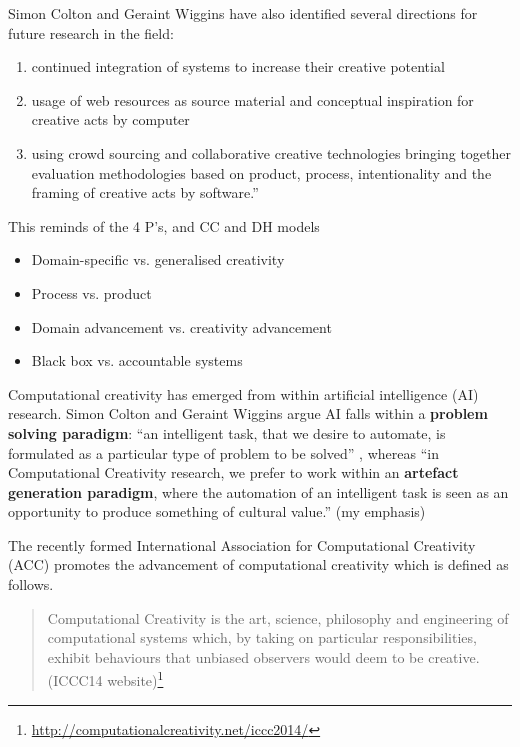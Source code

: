 Simon Colton and Geraint Wiggins have also identified several directions for future research in the field: \citep[p.5]{Colton2012}

\begin{enumerate}
  \item continued integration of systems to increase their creative potential
  \item usage of web resources as source material and conceptual inspiration for creative acts by computer
  \item using crowd sourcing and collaborative creative technologies bringing together evaluation methodologies based on product, process, intentionality and the framing of creative acts by software.'' \citep[p.5]{Colton2012}
\end{enumerate}

\begin{draft}
  This reminds of the 4 P’s, and CC and DH models
\end{draft}

\begin{shaded}
  \begin{itemize}
  \item Domain-specific vs. generalised creativity
  \item Process vs. product
  \item Domain advancement vs. creativity advancement
  \item Black box vs. accountable systems
  \end{itemize}
\end{shaded}

Computational creativity has emerged from within artificial intelligence (AI) research. Simon Colton and Geraint Wiggins argue AI falls within a \textbf{problem solving paradigm}: ``an intelligent task, that we desire to automate, is formulated as a particular type of problem to be solved'' \citep[p.2]{Colton2012},  whereas ``in Computational Creativity research, we prefer to work within an \textbf{artefact generation paradigm}, where the automation of an intelligent task is seen as an opportunity to produce something of cultural value.'' \citep[p.2]{Colton2012}(my emphasis)

The recently formed International Association for Computational Creativity (ACC)  promotes the advancement of computational creativity which is defined as follows.

\begin{quote}
  Computational Creativity is the art, science, philosophy and engineering of computational systems which, by taking on particular responsibilities, exhibit behaviours that unbiased observers would deem to be creative. (ICCC14 website)\footnote{\url{http://computationalcreativity.net/iccc2014/}}
\end{quote}

